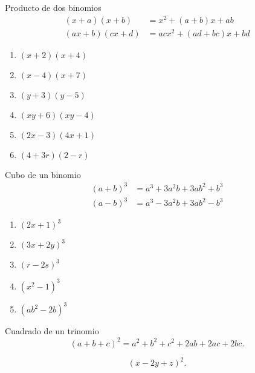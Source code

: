 {Producto de dos binomios}
	\begin{align*}
		\left( x+a \right)\left( x+b \right)&=
		x^{2}+\left( a+b \right)x+ab\\
		\left( ax+b \right)\left( cx+d \right)&=
		acx^{2}+\left( ad+bc \right)x+bd
	\end{align*}
	



	\begin{problema}
		\begin{enumerate}
			\item $\left( x+2 \right)\left( x+4 \right)$ 
			\item $\left( x-4 \right)\left( x+7 \right)$ 
			\item $\left( y+3 \right)\left( y-5 \right)$ 
			\item $\left( xy+6 \right)\left( xy-4 \right)$ 
			\item $\left( 2x-3 \right)\left( 4x+1 \right)$ 
			\item $\left( 4+3r \right)\left( 2-r \right)$
		\end{enumerate}
		
	\end{problema}
	



{Cubo de un binomio}
	\begin{align*}
		\left( a+b \right)^{3}&=
		a^{3}+3a^{2}b+3ab^{2}+b^{3}\\
		\left( a-b \right)^{3}&=
		a^{3}-3a^{2}b+3ab^{2}-b^{3}
	\end{align*}
	



	\begin{problema}
		\begin{enumerate}
			\item $\left( 2x+1 \right)^{3}$ 
			\item $\left( 3x+2y \right)^{3}$ 
			\item $\left( r-2s \right)^{3}$ 
			\item $\left( x^{2}-1 \right)^{3}$ 
			\item $\left( ab^{2}-2b \right)^{3}$
		\end{enumerate}
		
	\end{problema}
	



{Cuadrado de un trinomio}
	\[
		\left( a+b+c \right)^{2}=
		a^{2}+b^{2}+c^{2}+2ab+2ac+2bc.
	\]
	



	\begin{problema}
		$$
		\left( x-2y+z \right)^{2}. 
		$$
	\end{problema}
	

